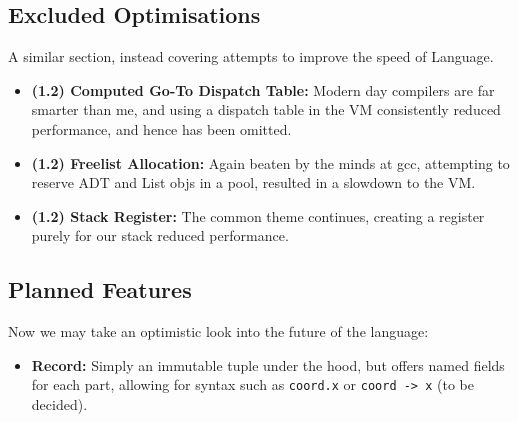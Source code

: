 \documentclass[11pt, a4paper]{article}
\begin{document}
\subsection{Excluded Optimisations}

A similar section, instead covering attempts to improve the speed of Language.
\begin{itemize}
    \item \textbf{(1.2) Computed Go-To Dispatch Table:} Modern day compilers are far smarter than me, and using a dispatch table in the VM consistently reduced performance, and hence has been omitted.
    \item \textbf{(1.2) Freelist Allocation:} Again beaten by the minds at gcc, attempting to reserve ADT and List objs in a pool, resulted in a slowdown to the VM.
    \item \textbf{(1.2) Stack Register:} The common theme continues, creating a register purely for our stack reduced performance.
\end{itemize}

\subsection{Planned Features}
Now we may take an optimistic look into the future of the language:
\begin{itemize}
    \item \textbf{Record:} Simply an immutable tuple under the hood, but offers named fields for each part, allowing for syntax such as \texttt{coord.x} or \texttt{coord -> x} (to be decided).
\end{itemize}
\end{document}
